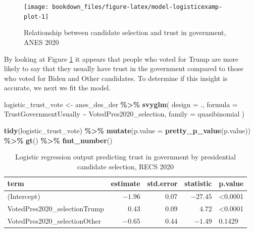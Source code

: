 \documentclass[
]{krantz}
\makeatletter
\newenvironment{Shaded}{\begin{snugshade}}{\end{snugshade}}
\newcommand{\AttributeTok}[1]{\textcolor[rgb]{0.27,0.27,0.27}{#1}}
\newcommand{\FunctionTok}[1]{\textcolor[rgb]{0.27,0.27,0.27}{\textbf{#1}}}
\newcommand{\NormalTok}[1]{#1}
\newcommand{\OtherTok}[1]{\textcolor[rgb]{0.37,0.37,0.37}{#1}}
\newcommand{\SpecialCharTok}[1]{\textcolor[rgb]{0.43,0.43,0.43}{\textbf{#1}}}
\newenvironment{kframe}{%
\medskip{}
\setlength{\fboxsep}{.8em}
 \def\at@end@of@kframe{}%
 \ifinner\ifhmode%
  \def\at@end@of@kframe{\end{minipage}}%
  \begin{minipage}{\columnwidth}%
 \fi\fi%
 \def\FrameCommand##1{\hskip\@totalleftmargin \hskip-\fboxsep
 \colorbox{shadecolor}{##1}\hskip-\fboxsep
     \hskip-\linewidth \hskip-\@totalleftmargin \hskip\columnwidth}%
 \MakeFramed {\advance\hsize-\width
   \@totalleftmargin\z@ \linewidth\hsize
   \@setminipage}}%
 {\par\unskip\endMakeFramed%
 \at@end@of@kframe}
\renewenvironment{Shaded}{\begin{kframe}}{\end{kframe}}
\makeatother
\begin{document}
\begin{figure}
\texttt{[image: bookdown\_files/figure-latex/model-logisticexamp-plot-1]} \caption{Relationship between candidate selection and trust in government, ANES 2020}\label{fig:model-logisticexamp-plot}
\end{figure}

By looking at Figure \ref{fig:model-logisticexamp-plot} it appears that people who voted for Trump are more likely to say that they usually have trust in the government compared to those who voted for Biden and Other candidates. To determine if this insight is accurate, we next we fit the model.

\begin{Shaded}
\begin{Highlighting}[]
\NormalTok{logistic\_trust\_vote }\OtherTok{\textless{}{-}}\NormalTok{ anes\_des\_der }\SpecialCharTok{\%\textgreater{}\%}
  \FunctionTok{svyglm}\NormalTok{(}
    \AttributeTok{design =}\NormalTok{ .,}
    \AttributeTok{formula =}\NormalTok{ TrustGovernmentUsually }\SpecialCharTok{\textasciitilde{}}\NormalTok{ VotedPres2020\_selection,}
    \AttributeTok{family =}\NormalTok{ quasibinomial}
\NormalTok{  )}
\end{Highlighting}
\end{Shaded}

\begin{Shaded}
\begin{Highlighting}[]
\FunctionTok{tidy}\NormalTok{(logistic\_trust\_vote) }\SpecialCharTok{\%\textgreater{}\%}
  \FunctionTok{mutate}\NormalTok{(}\AttributeTok{p.value =} \FunctionTok{pretty\_p\_value}\NormalTok{(p.value)) }\SpecialCharTok{\%\textgreater{}\%}
  \FunctionTok{gt}\NormalTok{() }\SpecialCharTok{\%\textgreater{}\%}
  \FunctionTok{fmt\_number}\NormalTok{()}
\end{Highlighting}
\end{Shaded}



\begin{longtable}{lrrrl}
\caption{\label{tab:model-logisticexamp-tab}Logistic regression output predicting trust in government by presidential candidate selection, RECS 2020}\\
\toprule
term & estimate & std.error & statistic & p.value \\ 
\midrule\relax
(Intercept) & $-1.96$ & $0.07$ & $-27.45$ & <0.0001 \\ 
VotedPres2020\_selectionTrump & $0.43$ & $0.09$ & $4.72$ & <0.0001 \\ 
VotedPres2020\_selectionOther & $-0.65$ & $0.44$ & $-1.49$ & 0.1429 \\ 
\bottomrule
\end{longtable}
\end{document}
